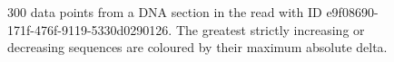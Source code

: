 \begin{figure}
\centering

\caption{\label{fig:epsilon}300 data points from a DNA section in the read with ID e9f08690-171f-476f-9119-5330d0290126. The greatest strictly increasing or decreasing sequences are coloured by their maximum absolute delta.}
\end{figure}
